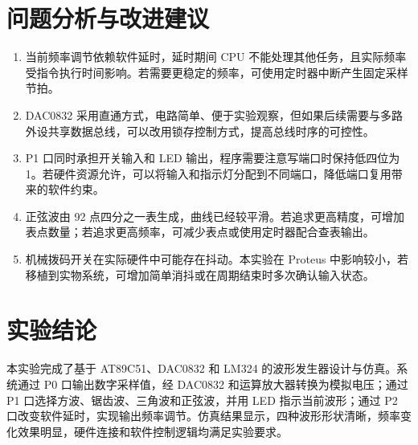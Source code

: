 \section{问题分析与改进建议}
\begin{enumerate}
  \item 当前频率调节依赖软件延时，延时期间 CPU 不能处理其他任务，且实际频率受指令执行时间影响。若需要更稳定的频率，可使用定时器中断产生固定采样节拍。
  \item DAC0832 采用直通方式，电路简单、便于实验观察，但如果后续需要与多路外设共享数据总线，可以改用锁存控制方式，提高总线时序的可控性。
  \item P1 口同时承担开关输入和 LED 输出，程序需要注意写端口时保持低四位为 1。若硬件资源允许，可以将输入和指示灯分配到不同端口，降低端口复用带来的软件约束。
  \item 正弦波由 92 点四分之一表生成，曲线已经较平滑。若追求更高精度，可增加表点数量；若追求更高频率，可减少表点或使用定时器配合查表输出。
  \item 机械拨码开关在实际硬件中可能存在抖动。本实验在 Proteus 中影响较小，若移植到实物系统，可增加简单消抖或在周期结束时多次确认输入状态。
\end{enumerate}

\section{实验结论}
本实验完成了基于 AT89C51、DAC0832 和 LM324 的波形发生器设计与仿真。系统通过 P0 口输出数字采样值，经 DAC0832 和运算放大器转换为模拟电压；通过 P1 口选择方波、锯齿波、三角波和正弦波，并用 LED 指示当前波形；通过 P2 口改变软件延时，实现输出频率调节。仿真结果显示，四种波形形状清晰，频率变化效果明显，硬件连接和软件控制逻辑均满足实验要求。
